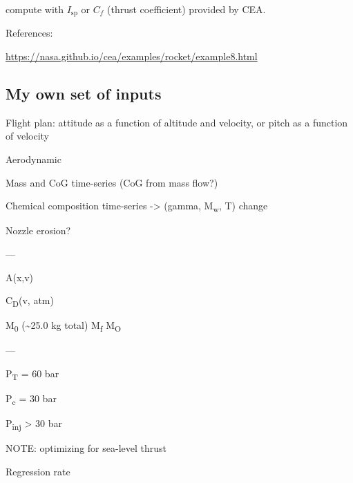 \documentclass[fleqn]{article}
\begin{document}
compute with \(I_\text{sp}\) or \(C_f\) (thrust coefficient) provided by CEA.

References:

\url{https://nasa.github.io/cea/examples/rocket/example8.html}
\subsection{My own set of inputs}
\label{sec:org99f8c40}

Flight plan: attitude as a function of altitude and velocity, or pitch as a
function of velocity

Aerodynamic

Mass and CoG time-series (CoG from mass flow?)

Chemical composition time-series -> (gamma, M\textsubscript{w}, T) change

Nozzle erosion?

---

A(x,v)

C\textsubscript{D}(v, atm)

M\textsubscript{0} (\textasciitilde{}25.0 kg total) M\textsubscript{f} M\textsubscript{O}

---

P\textsubscript{T} = 60 bar

P\textsubscript{c} = 30 bar

P\textsubscript{inj} > 30 bar


NOTE: optimizing for sea-level thrust

Regression rate
\end{document}
